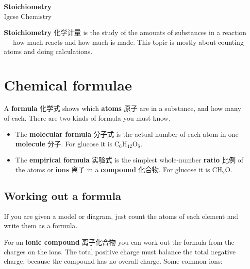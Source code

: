 \documentclass[11pt]{article}
\begin{document}
\begin{center}
  {\LARGE\bfseries Stoichiometry}\\[0.35em]
  {\large Igcse Chemistry}
\end{center}
\vspace{0.6em}

\textbf{Stoichiometry} 化学计量 is the study of the amounts of substances in a reaction — how much reacts and how much is made. This topic is mostly about counting atoms and doing calculations.

\section*{Chemical formulae}

A \textbf{formula} 化学式 shows which \textbf{atoms} 原子 are in a substance, and how many of each. There are two kinds of formula you must know.

\begin{itemize}
\item The \textbf{molecular formula} 分子式 is the actual number of each atom in one \textbf{molecule} 分子. For glucose it is $\text{C}_6\text{H}_{12}\text{O}_6$.

\item The \textbf{empirical formula} 实验式 is the simplest whole-number \textbf{ratio} 比例 of the atoms or \textbf{ions} 离子 in a \textbf{compound} 化合物. For glucose it is $\text{CH}_2\text{O}$.

\end{itemize}

\subsection*{Working out a formula}

If you are given a model or diagram, just count the atoms of each element and write them as a formula.

For an \textbf{ionic compound} 离子化合物 you can work out the formula from the charges on the ions. The total positive charge must balance the total negative charge, because the compound has no overall charge. Some common ions:

\begin{center}
\end{center}
\end{document}
